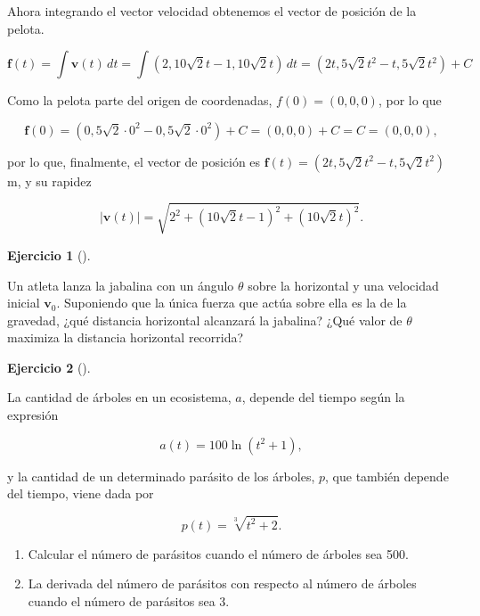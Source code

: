 \documentclass[
  a4paper,
]{scrreport}
\theoremstyle{definition}
\newtheorem{exercise}{Ejercicio}[chapter]
\theoremstyle{remark}
\begin{document}
\begin{tcolorbox}
Ahora integrando el vector velocidad obtenemos el vector de posición de
la pelota.

\[
\mathbf{f}(t)
= \int \mathbf{v}(t)\,dt 
= \int (2, 10\sqrt{2}t-1, 10\sqrt{2}t)\, dt 
= (2t, 5\sqrt{2}t^2-t, 5\sqrt{2}t^2) + C
\]

Como la pelota parte del origen de coordenadas, \(f(0)=(0,0,0)\), por lo
que

\[
\mathbf{f}(0) 
= (0, 5\sqrt{2}\cdot 0^2-0, 5\sqrt{2}\cdot 0^2) + C 
= (0, 0, 0) + C 
= C 
= (0, 0, 0), 
\]

por lo que, finalmente, el vector de posición es
\(\mathbf{f}(t)=(2t, 5\sqrt{2}t^2-t, 5\sqrt{2}t^2)\) m, y su rapidez

\[
|\mathbf{v}(t)| 
= \sqrt{2^2 + (10\sqrt{2}t-1)^2 + (10\sqrt{2}t)^2}.
\]

\end{tcolorbox}

\begin{exercise}[]\protect\hypertarget{exr-cinematica-jabalina}{}\label{exr-cinematica-jabalina}

Un atleta lanza la jabalina con un ángulo \(\theta\) sobre la horizontal
y una velocidad inicial \(\mathbf{v}_0\). Suponiendo que la única fuerza
que actúa sobre ella es la de la gravedad, ¿qué distancia horizontal
alcanzará la jabalina? ¿Qué valor de \(\theta\) maximiza la distancia
horizontal recorrida?

\end{exercise}

\begin{exercise}[]\protect\hypertarget{exr-parasitos}{}\label{exr-parasitos}

La cantidad de árboles en un ecosistema, \(a\), depende del tiempo según
la expresión

\[
a(t)=100\ln(t^2+1),
\]

y la cantidad de un determinado parásito de los árboles, \(p\), que
también depende del tiempo, viene dada por

\[
p(t) = \sqrt[3]{{t^2  + 2}}.
\]

\begin{enumerate}
\def\labelenumi{\alph{enumi}.}
\item
  Calcular el número de parásitos cuando el número de árboles sea 500.
\item
  La derivada del número de parásitos con respecto al número de árboles
  cuando el número de parásitos sea 3.
\end{enumerate}

\end{exercise}
\end{document}
